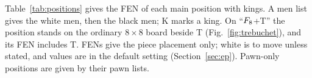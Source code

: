 \label{app:positions}

Table~\ref{tab:positions} gives the FEN of each main position with kings. A men list gives the white men, then
the black men; K marks a king. On ``$F_{8}$+T'' the position stands on the ordinary
$8\times8$ board beside T (Fig.~\ref{fig:trebuchet}), and its FEN includes T. FENs give the piece placement
only; white is to move unless stated, and values are in the default setting (Section~\ref{sec:ep}). Pawn-only
positions are given by their pawn lists.
